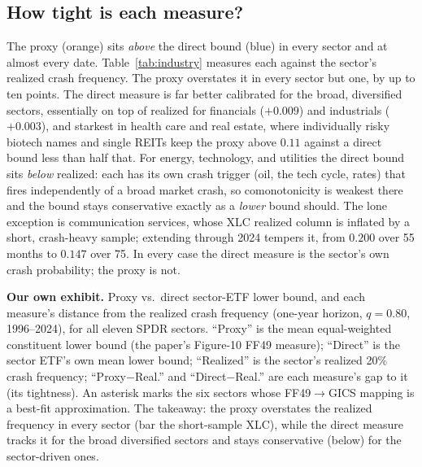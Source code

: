 \documentclass[12pt]{article}
\newcommand{\exhibitbreak}{\clearpage}
\newenvironment{leadin}%
  {\par\small\setlength{\columnsep}{20pt}%
   \setlength{\multicolsep}{3pt plus 1pt minus 1pt}%
   \setlength{\premulticols}{0pt}\setlength{\postmulticols}{0pt}%
   \begin{multicols}{2}}%
  {\end{multicols}\par\normalsize}
\begin{document}
\subsection{How tight is each measure?}
\begin{leadin}
The proxy (orange) sits \emph{above} the direct bound (blue) in every sector and at
almost every date. Table~\ref{tab:industry} measures each against the sector's realized
crash frequency. The proxy overstates it in every sector but one, by up to ten points.
The direct measure is far better calibrated for the broad, diversified sectors,
essentially on top of realized for financials ($+0.009$) and industrials ($+0.003$),
and starkest in health care and real estate, where individually risky biotech names and
single REITs keep the proxy above $0.11$ against a direct bound less than half that.
For energy, technology, and utilities the direct bound sits \emph{below} realized: each
has its own crash trigger (oil, the tech cycle, rates) that fires independently of a
broad market crash, so comonotonicity is weakest there and the bound stays conservative
exactly as a \emph{lower} bound should. The lone exception is communication services,
whose XLC realized column is inflated by a short, crash-heavy sample; extending through
2024 tempers it, from $0.200$ over 55 months to $0.147$ over 75. In every case the
direct measure is the sector's own crash probability; the proxy is not.
\end{leadin}
\begin{table}[H]
\centering
\small
\caption[Proxy vs.\ direct tightness]{\textbf{Our own exhibit.} Proxy vs.\ direct
sector-ETF lower bound, and each measure's distance from the realized crash frequency
(one-year horizon, $q=0.80$, 1996--2024), for all eleven SPDR sectors. ``Proxy'' is
the mean equal-weighted constituent lower bound (the paper's Figure-10 FF49 measure);
``Direct'' is the sector ETF's own mean lower bound; ``Realized'' is the sector's
realized 20\% crash frequency; ``Proxy$-$Real.'' and ``Direct$-$Real.'' are each
measure's gap to it (its tightness). An asterisk marks the six sectors whose
FF49$\to$GICS mapping is a best-fit approximation. The takeaway: the proxy overstates
the realized frequency in every sector (bar the short-sample XLC), while the direct
measure tracks it for the broad diversified sectors and stays conservative (below) for
the sector-driven ones.}
\label{tab:industry}
\resizebox{\textwidth}{!}{}
\end{table}
\exhibitbreak
\end{document}
